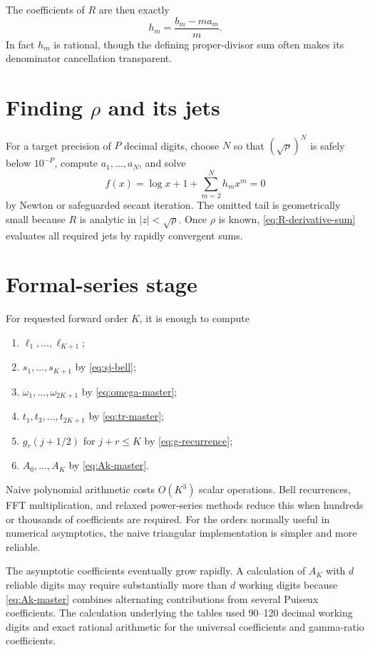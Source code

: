 \documentclass[11pt,a4paper,oneside,openany]{book}
\theoremstyle{definition}
\theoremstyle{remark}
\begin{document}
The coefficients of $R$ are then exactly
\begin{equation}
 h_m=\frac{b_m-ma_m}{m}.
 \label{eq:algorithm-h}
\end{equation}
In fact $h_m$ is rational, though the defining proper-divisor sum often makes
its denominator cancellation transparent.

\section{Finding \texorpdfstring{$\rho$}{rho} and its jets}
For a target precision of $P$ decimal digits, choose $N$ so that
$(\sqrt\rho)^N$ is safely below $10^{-P}$, compute $a_1,\ldots,a_N$, and solve
\begin{equation}
 f(x)=\log x+1+\sum_{m=2}^{N}h_mx^m=0
 \label{eq:rho-truncated-equation}
\end{equation}
by Newton or safeguarded secant iteration.  The omitted tail is geometrically
small because $R$ is analytic in $|z|<\sqrt\rho$.  Once $\rho$ is known,
\cref{eq:R-derivative-sum} evaluates all required jets by rapidly convergent
sums.

\section{Formal-series stage}
For requested forward order $K$, it is enough to compute
\begin{enumerate}
\item $\ell_1,\ldots,\ell_{K+1}$;
\item $s_1,\ldots,s_{K+1}$ by \cref{eq:sj-bell};
\item $\omega_1,\ldots,\omega_{2K+1}$ by \cref{eq:omega-master};
\item $t_1,t_3,\ldots,t_{2K+1}$ by \cref{eq:tr-master};
\item $g_r(j+1/2)$ for $j+r\le K$ by \cref{eq:g-recurrence};
\item $A_0,\ldots,A_K$ by \cref{eq:Ak-master}.
\end{enumerate}
Naive polynomial arithmetic costs $O(K^3)$ scalar operations.  Bell recurrences,
FFT multiplication, and relaxed power-series methods reduce this when hundreds
or thousands of coefficients are required.  For the orders normally useful in
numerical asymptotics, the naive triangular implementation is simpler and more
reliable.

\begin{warningbox}[title={Precision discipline}]
The asymptotic coefficients eventually grow rapidly.  A calculation of
$A_K$ with $d$ reliable digits may require substantially more than $d$ working
digits because \cref{eq:Ak-master} combines alternating contributions from
several Puiseux coefficients.  The calculation underlying the tables used 90--120
decimal working digits and exact rational arithmetic for the universal
coefficients and gamma-ratio coefficients.
\end{warningbox}
\end{document}
